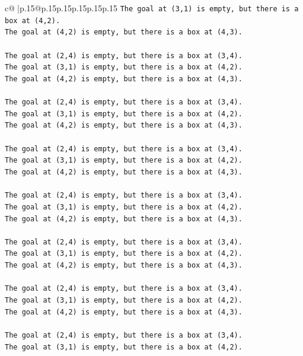 \documentclass{article}
\begin{document}
{\begin{supertabular}{c@{$\;$}|p{.15\linewidth}@{}p{.15\linewidth}p{.15\linewidth}p{.15\linewidth}p{.15\linewidth}p{.15\linewidth}}
{{{\texttt{The goal at (3,1) is empty, but there is a box at (4,2).} \\
\texttt{The goal at (4,2) is empty, but there is a box at (4,3).} \\
\\ 
\texttt{The goal at (2,4) is empty, but there is a box at (3,4).} \\
\texttt{The goal at (3,1) is empty, but there is a box at (4,2).} \\
\texttt{The goal at (4,2) is empty, but there is a box at (4,3).} \\
\\ 
\texttt{The goal at (2,4) is empty, but there is a box at (3,4).} \\
\texttt{The goal at (3,1) is empty, but there is a box at (4,2).} \\
\texttt{The goal at (4,2) is empty, but there is a box at (4,3).} \\
\\ 
\texttt{The goal at (2,4) is empty, but there is a box at (3,4).} \\
\texttt{The goal at (3,1) is empty, but there is a box at (4,2).} \\
\texttt{The goal at (4,2) is empty, but there is a box at (4,3).} \\
\\ 
\texttt{The goal at (2,4) is empty, but there is a box at (3,4).} \\
\texttt{The goal at (3,1) is empty, but there is a box at (4,2).} \\
\texttt{The goal at (4,2) is empty, but there is a box at (4,3).} \\
\\ 
\texttt{The goal at (2,4) is empty, but there is a box at (3,4).} \\
\texttt{The goal at (3,1) is empty, but there is a box at (4,2).} \\
\texttt{The goal at (4,2) is empty, but there is a box at (4,3).} \\
\\ 
\texttt{The goal at (2,4) is empty, but there is a box at (3,4).} \\
\texttt{The goal at (3,1) is empty, but there is a box at (4,2).} \\
\texttt{The goal at (4,2) is empty, but there is a box at (4,3).} \\
\\ 
\texttt{The goal at (2,4) is empty, but there is a box at (3,4).} \\
\texttt{The goal at (3,1) is empty, but there is a box at (4,2).} \\
}}}
\end{supertabular}}
\end{document}
